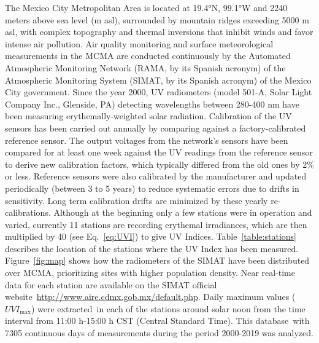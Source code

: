 \documentclass[journal=jacsat,manuscript=article]{achemso}
\begin{document}
The Mexico City Metropolitan Area is located at 19.4°N, 99.1°W and 2240
meters above sea level (m asl), surrounded by mountain ridges exceeding
5000 m asl, with complex topography and thermal inversions that inhibit
winds and favor intense air pollution.\citep{Whiteman_2000,Fast_2007,Carre_n_Sierra_2015}
Air quality
monitoring and surface meteorological measurements in the MCMA are
conducted continuously by the Automated Atmospheric Monitoring Network
(RAMA, by its Spanish acronym) of the Atmospheric Monitoring System
(SIMAT, by its Spanish acronym) of the Mexico City government. Since the
year 2000, UV radiometers (model 501-A, Solar Light Company Inc.,
Glenside, PA) detecting wavelengths between 280-400 nm have been
measuring erythemally-weighted solar radiation. Calibration of the
UV sensors has been carried out annually by comparing against a
factory-calibrated reference sensor. The output voltages from the
network’s sensors have been compared for at least one week against the UV
readings from the reference sensor to derive new calibration factors, which typically differed
from the old ones by 2\% or less.
Reference sensors were also calibrated by the manufacturer and updated
periodically (between 3 to 5 years) to reduce systematic errors due to drifts in sensitivity.
Long term calibration drifts are minimized by these yearly re-calibrations.
Although at the beginning only a few stations were in operation and
varied, currently 11 stations are recording erythemal
irradiances, which are then multiplied by 40 (see
Eq.~{\ref{eq:UVI}}) to give UV Indices.
Table~{\ref{table:stations}} describes the location of
the stations where the UV Index has been measured.
Figure~{\ref{fig:map}} shows how the radiometers of the
SIMAT have been distributed over MCMA, prioritizing sites with higher population density.
Near real-time data for each station are
available on the SIMAT official
website~\url{http://www.aire.cdmx.gob.mx/default.php}. Daily maximum
values (\(UVI_{\max}\)) were extracted~in each of the stations
around solar noon from the time interval from 11:00 h-15:00 h CST
(Central Standard Time). This database~with 7305 continuous days of
measurements during the period 2000-2019 was analyzed.
\end{document}

